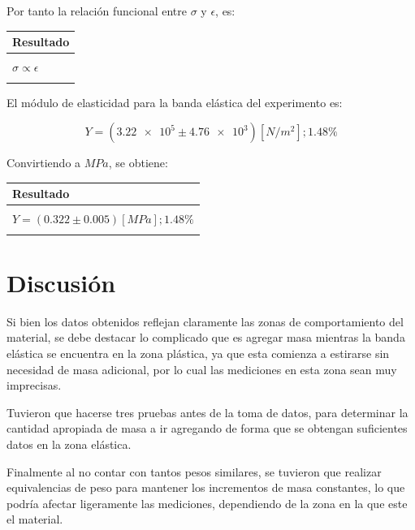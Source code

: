 \documentclass[letter,11pt]{article}
\begin{document}
Por tanto la relación funcional entre $\sigma$ y $\epsilon$, es:

\begin{center}
\begin{tabular}{|>{\centering}m{9.2cm}<{\centering}|}
\hline
\textbf{Resultado} 
\tabularnewline \hline
\\
$\sigma \propto \epsilon$ \tabularnewline
\\
\hline
\end{tabular}
\end{center}
\vspace{0.10cm}

El módulo de elasticidad para la banda elástica del experimento es:

\begin{equation*}
    Y = (\num{3.22e5} \pm \num{4.76e3}) [N/m^2]; 1.48\%
\end{equation*}
\vspace{0.10cm}

Convirtiendo a $MPa$, se obtiene:

\begin{center}
\begin{tabular}{|>{\centering}m{9.2cm}<{\centering}|}
\hline
\textbf{Resultado} 
\tabularnewline \hline
\\
$Y = (0.322 \pm 0.005) [MPa]; 1.48\%$ \tabularnewline
\\
\hline
\end{tabular}
\end{center}
\vspace{0.10cm}

\section{Discusión}

Si bien los datos obtenidos reflejan claramente las zonas de comportamiento del
material, se debe destacar lo complicado que es agregar masa mientras la banda
elástica se encuentra en la zona plástica, ya que esta comienza a estirarse sin
necesidad de masa adicional, por lo cual las mediciones en esta zona sean muy
imprecisas.

Tuvieron que hacerse tres pruebas antes de la toma de datos, para determinar la
cantidad apropiada de masa a ir agregando de forma que se obtengan suficientes
datos en la zona elástica.

Finalmente al no contar con tantos pesos similares, se tuvieron que realizar
equivalencias de peso para mantener los incrementos de masa constantes, lo que
podría afectar ligeramente las mediciones, dependiendo de la zona en la que este
el material.
\end{document}
